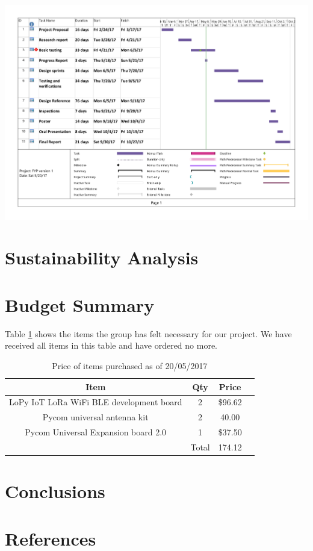 \documentclass[a4paper,12pt]{article}
\begin{document}
\centering
\includegraphics[scale=0.5]{gnattchart2.pdf}
\raggedright

\clearpage
\section{Sustainability Analysis}
\clearpage
\section{Budget Summary}

Table \ref{table:purchases} shows the items the group has felt necessary for our project. We have received all items in this table and have ordered no more. 

\begin{table}[h!]
\centering
\caption{Price of items purchased as of 20/05/2017}
\begin{tabular}{||c|c|c|c||} 
 \hline
 Item & Qty & Price\\
 \hline
 \hline
 LoPy IoT LoRa WiFi BLE development board & 2 & \$96.62 \\
 \hline
 Pycom universal antenna kit & 2 & 40.00\\
 \hline 
 Pycom Universal Expansion board 2.0 & 1 & \$37.50 \\ 
 \hline
  & Total &  174.12\\ 
 \hline
\end{tabular}
\label{table:purchases}
\end{table}
\raggedright




\clearpage

\section{Conclusions}
\clearpage
\section{References}
\end{document}

